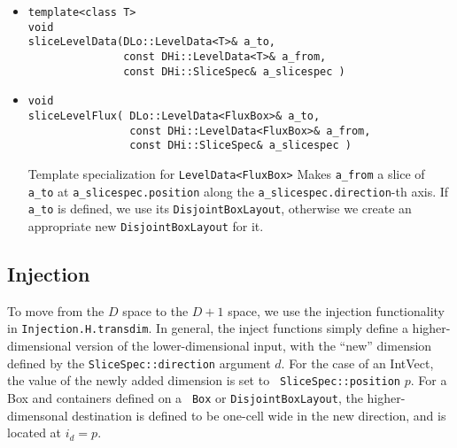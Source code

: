\begin{itemize}
\item
\begin{verbatim}
template<class T> 
void
sliceLevelData(DLo::LevelData<T>& a_to,
               const DHi::LevelData<T>& a_from,
               const DHi::SliceSpec& a_slicespec )
\end{verbatim}


\item
\begin{verbatim}
void
sliceLevelFlux( DLo::LevelData<FluxBox>& a_to,
                const DHi::LevelData<FluxBox>& a_from,
                const DHi::SliceSpec& a_slicespec )
\end{verbatim} 
Template specialization for \verb/LevelData<FluxBox>/
Makes \verb/a_from/ a slice of \verb/a_to/ at
\verb/a_slicespec.position/ along the \verb/a_slicespec.direction/-th
axis. If \verb/a_to/ is defined, we use its {\tt DisjointBoxLayout},
otherwise we create an appropriate new {\tt DisjointBoxLayout} for it. 

\end{itemize}


\subsection{Injection}
To move from the $D$ space to the $D+1$ space, we use the injection
functionality in {\tt Injection.H.transdim}. In general, the inject
functions simply define a higher-dimensional version of the
lower-dimensional input, with the ``new'' dimension defined by the
{\tt SliceSpec::direction} argument $d$. For the case of an IntVect,
the value of the newly added dimension is set to {\tt
  SliceSpec::position} $p$. For a Box and containers defined on a {\tt
  Box} or {\tt DisjointBoxLayout}, the higher-dimensonal destination
is defined to be one-cell wide in the new direction, and is located at
$i_d= p$.  

